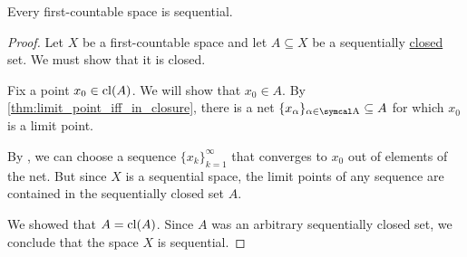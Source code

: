 \begin{proposition}\label{thm:first_countable_spaces_are_sequential}
  Every first-countable space is sequential.
\end{proposition}
\begin{proof}
  Let \( X \) be a first-countable space and let \( A \subseteq X \) be a sequentially \hyperref[def:sequential_closure_operator]{closed} set. We must show that it is closed.

  Fix a point \( x_0 \in \operatorname{cl}(A) \). We will show that \( x_0 \in A \). By \cref{thm:limit_point_iff_in_closure}, there is a net \( \{ x_\al \}_{\al \in \CA} \subseteq A \) for which \( x_0 \) is a limit point.

  By , we can choose a sequence \( \{ x_k \}_{k=1}^\infty \) that converges to \( x_0 \) out of elements of the net. But since \( X \) is a sequential space, the limit points of any sequence are contained in the sequentially closed set \( A \).

  We showed that \( A = \operatorname{cl}(A) \). Since \( A \) was an arbitrary sequentially closed set, we conclude that the space \( X \) is sequential.
\end{proof}
